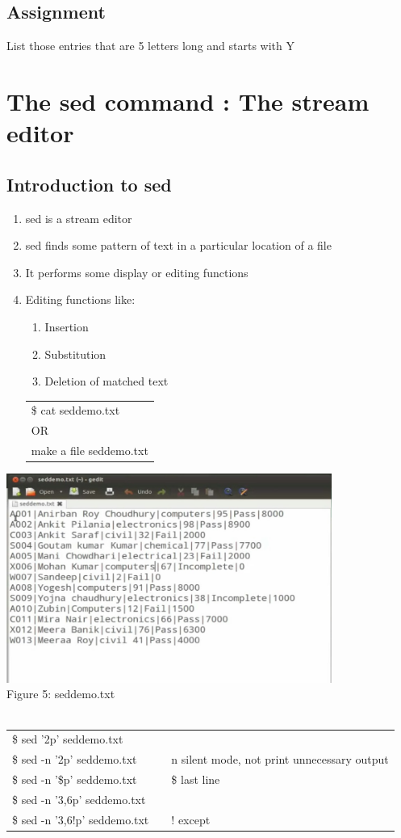 \documentclass[12pt, a4paper]{report}
\begin{document}
\section{Assignment}
List those entries that are 5 letters long and starts with Y
%
\chapter{The sed command : The stream editor}
\section{Introduction to sed}
\begin{enumerate}
\item sed is a stream editor
\item sed finds some pattern of text in a particular location of a file
\item It performs some display or editing functions
\item Editing functions like:
\begin{enumerate}
\item Insertion
\item Substitution
\item Deletion of matched text
\end{enumerate}
\begin{tabular}{|l|}\hline
\$ cat seddemo.txt\\
OR\\
make a file seddemo.txt\\ \hline
\end{tabular}
\end{enumerate}
\includegraphics[width=0.8\textwidth]{17_sed.jpg}\\
Figure 5: seddemo.txt\\
\\
\begin{tabular}{|lcl|}\hline
\$ sed '2p' seddemo.txt && \\
\$ sed -n '2p' seddemo.txt	&& n silent mode, not print unnecessary output\\
\$ sed -n '\$p' seddemo.txt	&& \$ last line\\
\$ sed -n '3,6p' seddemo.txt && \\
\$ sed -n '3,6!p' seddemo.txt && ! except\\ \hline
\end{tabular}
\end{document}
